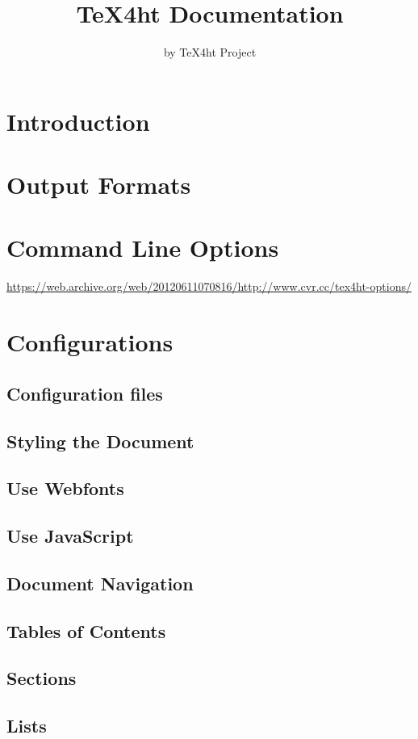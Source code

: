 \documentclass{book}
\title{TeX4ht Documentation}
\author{by TeX4ht Project}
\begin{document}
\maketitle
\tableofcontents


\chapter{Introduction}

\chapter{Output Formats}
\chapter{Command Line Options}

\url{https://web.archive.org/web/20120611070816/http://www.cvr.cc/tex4ht-options/}

\chapter{Configurations}
\section{Configuration files}
\section{Styling the Document}
\section{Use Webfonts}
\section{Use JavaScript}
\section{Document Navigation}
\section{Tables of Contents}

\section{Sections}
\section{Lists}
\end{document}

